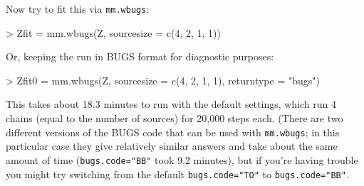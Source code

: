 \documentclass[11pt]{article}
\begin{document}
Now try to fit this via {\tt mm.wbugs}:
\begin{Schunk}
\begin{Sinput}
> Zfit = mm.wbugs(Z, sourcesize = c(4, 2, 1, 1))
\end{Sinput}
\end{Schunk}

Or, keeping the run in BUGS format for diagnostic purposes:
\begin{Schunk}
\begin{Sinput}
> Zfit0 = mm.wbugs(Z, sourcesize = c(4, 2, 1, 1), returntype = "bugs")
\end{Sinput}
\end{Schunk}

This takes about 18.3 minutes to run with the
default settings, which run 4 chains (equal to the number of
sources) for 20,000 steps each.
(There are two different versions of the BUGS code that can
be used with {\tt mm.wbugs}; in this particular case they
give relatively similar answers and take about the same amount
of time ({\tt bugs.code="BB"} took 9.2 minutes), 
but if you're having trouble you might try switching
from the default {\tt bugs.code="TO"} to {\tt bugs.code="BB"}.
\end{document}

